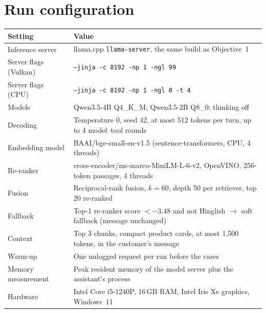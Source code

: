 \documentclass[11pt,a4paper]{article}
\begin{document}
\section{Run configuration}\label{app:config}
\begin{small}
\begin{tabularx}{\textwidth}{l L}
\toprule
Setting & Value \\
\midrule
Inference server & llama.cpp \texttt{llama-server}, the same build as Objective~1 \\
Server flags (Vulkan) & \texttt{--jinja -c 8192 -np 1 -ngl 99} \\
Server flags (CPU) & \texttt{--jinja -c 8192 -np 1 -ngl 0 -t 4} \\
Models & Qwen3.5-4B Q4\_K\_M; Qwen3.5-2B Q8\_0; thinking off \\
Decoding & Temperature 0, seed 42, at most 512 tokens per turn, up to 4 model--tool rounds \\
Embedding model & BAAI/bge-small-en-v1.5 (sentence-transformers, CPU, 4 threads) \\
Re-ranker & cross-encoder/ms-marco-MiniLM-L-6-v2, OpenVINO, 256-token passages, 4 threads \\
Fusion & Reciprocal-rank fusion, $k = 60$, depth 50 per retriever, top 20 re-ranked \\
Fallback & Top-1 re-ranker score $< -3.48$ and not Hinglish $\rightarrow$ soft fallback (message unchanged) \\
Context & Top 3 chunks, compact product cards, at most 1,500 tokens, in the customer's message \\
Warm-up & One unlogged request per run before the cases \\
Memory measurement & Peak resident memory of the model server plus the assistant's process \\
Hardware & Intel Core i5-1240P, 16\,GB RAM, Intel Iris Xe graphics, Windows~11 \\
\bottomrule
\end{tabularx}
\end{small}
\end{document}
